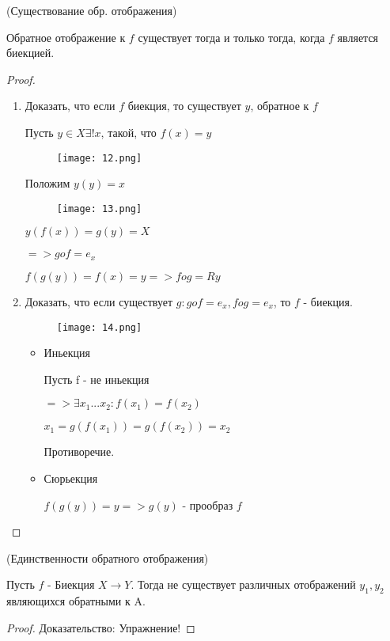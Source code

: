 \begin{theorem}(Существование обр. отображения)

Обратное отображение к $f$ существует тогда и только тогда, когда $f$ является биекцией.

\begin{proof}
\begin{enumerate}
\item {
Доказать, что если $f$ биекция, то существует $y$, обратное к $f$

Пусть $y \in X \exists! x$, такой, что $f(x) = y$

\begin{figure}[H]
    \centering
    \texttt{[image: 12.png]}
    
    
    \label{fig:12}
\end{figure}

Положим $y(y) = x$

\begin{figure}[H]
    \centering
    \texttt{[image: 13.png]}
    
    
    \label{fig:13}
\end{figure}

$y(f(x)) = g(y) = X$

$=> g o f = e_x$

$f(g(y)) = f(x) = y => f o g = Ry$
}

\item {

Доказать, что если существует $g: g o f = e_x, f o g = e_x$, то $f$ - биекция.

\begin{figure}[H]
    \centering
    \texttt{[image: 14.png]}
    
    
    \label{fig:14}
\end{figure}

\begin{itemize}
\item {
    Иньекция

    Пусть f - не иньекция

    $=> \exists x_1 ... x_2 : f(x_1) = f(x_2)$

    $x_1 = g(f(x_1)) = g(f(x_2)) = x_2$

    Противоречие.
}

\item {
    Сюрьекция

    $f(g(y)) = y => g(y)$ - прообраз $f$
}
\end{itemize}

}
\end{enumerate}
\end{proof}
    
\end{theorem}

\begin{theorem} (Единственности обратного отображения)

    Пусть $f$ - Биекция $X \rightarrow Y$. Тогда не существует различных отображений $y_1, y_2$ являющихся обратными к A.

\begin{proof}
    Доказательство: Упражнение! %
\end{proof}
\end{theorem}